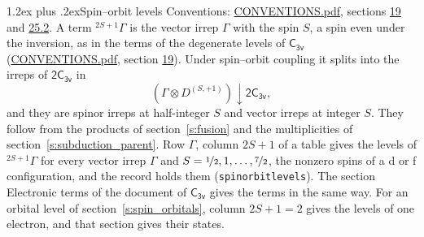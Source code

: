 \documentclass[10pt,a4paper]{article}
\makeatletter
\renewcommand\section{\@startsection{section}{1}{\z@}{-3ex plus -1ex minus -.2ex}%
  {1.2ex plus .2ex}{\normalfont\large\sffamily\bfseries\color{parttitle}}}
\numberwithin{equation}{section}
\newcommand{\grp}[1]{\mathsf{#1}}
\newcommand{\restr}[2]{#1\!\downarrow#2}
\newcommand{\irrJp}[2]{D^{(#1,#2)}}
\newcommand{\irrprod}{\otimes}
\newcommand{\term}[2]{{}^{#1}#2}
\makeatother
\begin{document}
\section{Spin--orbit levels}\label{s:spin_orbit}
Conventions: \href{../../CONVENTIONS.pdf}{CONVENTIONS.pdf}, sections \href{../../../rotation/CONVENTIONS.pdf\#conv.19}{19} and \href{../../CONVENTIONS.pdf\#conv.25.2}{25.2}.
\leavevmode\label{n:local.spin}\label{n:symbol.term}A term $\term{2S+1}{\Gamma}$ is the vector irrep $\Gamma$ with the spin $S$, a spin even under the inversion, as in the terms of the degenerate levels of \href{../../../rotation/data/pdf/C3v.pdf}{$\grp{C_{3v}}$} (\href{../../CONVENTIONS.pdf}{CONVENTIONS.pdf}, section \href{../../../rotation/CONVENTIONS.pdf\#conv.19}{19}). Under spin--orbit coupling it splits into the irreps of $\grp{2C_{3v}}$ in
\begin{equation}\label{e:spinorbit}\restr{(\Gamma \irrprod \irrJp{S}{+1})}{\grp{2C_{3v}}},\end{equation}
and they are spinor irreps at half-integer $S$ and vector irreps at integer $S$. They follow from the products of section~\ref{s:fusion} and the multiplicities of section~\ref{s:subduction_parent}. Row $\Gamma$, column $2S + 1$ of a table gives the levels of $\term{2S+1}{\Gamma}$ for every vector irrep $\Gamma$ and $S = \nicefrac{1}{2}, 1, \dots, \nicefrac{7}{2}$, the nonzero spins of a d or f configuration, and the record holds them (\texttt{spinorbitlevels}). The section Electronic terms of the document of \href{../../../rotation/data/pdf/C3v.pdf}{$\grp{C_{3v}}$} gives the terms in the same way. For an orbital level of section~\ref{s:spin_orbitals}, column $2S + 1 = 2$ gives the levels of one electron, and that section gives their states.
\end{document}
